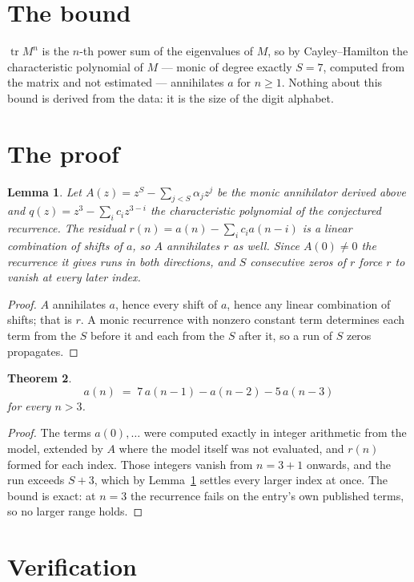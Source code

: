 \documentclass[11pt,a4paper]{article}
\theoremstyle{plain}
\newtheorem{theorem}{Theorem}
\newtheorem{lemma}[theorem]{Lemma}
\theoremstyle{definition}
\begin{document}
\section{The bound}

$\operatorname{tr}M^{n}$ is the $n$-th power sum of the eigenvalues of $M$, so by
Cayley--Hamilton the characteristic polynomial of $M$ --- monic of degree exactly $S=7$,
computed from the matrix and not estimated --- annihilates $a$ for $n\ge1$. Nothing about this
bound is derived from the data: it is the size of the digit alphabet.

\section{The proof}

\begin{lemma}\label{lem:crit}
Let $A(z)=z^S-\sum_{j<S}\alpha_jz^{j}$ be the monic annihilator derived above and
$q(z)=z^{3}-\sum_ic_iz^{3-i}$ the characteristic polynomial of the conjectured
recurrence. The residual $r(n)=a(n)-\sum_ic_ia(n-i)$ is a linear combination of shifts of $a$,
so $A$ annihilates $r$ as well. Since $A(0)\ne0$ the recurrence it gives runs in both
directions, and $S$ consecutive zeros of $r$ force $r$ to vanish at every later index.
\end{lemma}

\begin{proof}
$A$ annihilates $a$, hence every shift of $a$, hence any linear combination of shifts; that is
$r$. A monic recurrence with nonzero constant term determines each term from the $S$ before it
and each from the $S$ after it, so a run of $S$ zeros propagates.
\end{proof}

\begin{theorem}
\[
a(n)\;=\;7\,a(n-1) - a(n-2) - 5\,a(n-3)
\]
for every $n>3$.
\end{theorem}

\begin{proof}
The terms $a(0),\dots$ were computed exactly in integer arithmetic from the model, extended by
$A$ where the model itself was not evaluated, and $r(n)$ formed for each index. Those integers
vanish from $n=3+1$ onwards, and the run exceeds $S+3$, which by
Lemma~\ref{lem:crit} settles every larger index at once. The bound is exact: at $n=3$ the recurrence fails on the entry's own published terms, so no larger range holds.
\end{proof}

\section{Verification}
\end{document}

